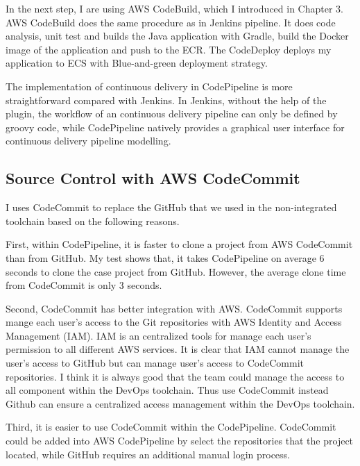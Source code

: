 \par
In the next step, I are using AWS CodeBuild, which I introduced in Chapter 3. AWS CodeBuild does the same procedure as in Jenkins pipeline. It does code analysis, unit test and builds the Java application with Gradle, build the Docker image of the application and push to the ECR. The CodeDeploy deploys my application to ECS with Blue-and-green deployment strategy.
\par
The implementation of continuous delivery in CodePipeline is more straightforward compared with Jenkins. In Jenkins, without the help of the plugin, the workflow of an continuous delivery pipeline can only be defined by groovy code, while CodePipeline natively provides a graphical user interface for continuous delivery pipeline modelling. 
\subsection{Source Control with AWS CodeCommit}
I uses CodeCommit to replace the GitHub that we used in the non-integrated toolchain based on the following reasons.
\par
First, within CodePipeline, it is faster to clone a project from AWS CodeCommit than from GitHub. My test shows that, it takes CodePipeline on average 6 seconds to clone the case project from GitHub. However, the average clone time from CodeCommit is only 3 seconds.
\par
Second, CodeCommit has better integration with AWS. CodeCommit supports mange each user's access to the Git repositories with AWS Identity and Access Management (IAM). IAM is an centralized tools for manage each user's permission to all different AWS services. It is clear that IAM cannot manage the user's access to GitHub but can manage user's access to CodeCommit repositories. I think it is always good that the team could manage the access to all component within the DevOps toolchain. Thus use CodeCommit instead Github can ensure a centralized access management within the DevOps toolchain.
\par
Third, it is easier to use CodeCommit within the CodePipeline. CodeCommit could be added into AWS CodePipeline by select the repositories that the project located, while GitHub requires an additional manual login process.
